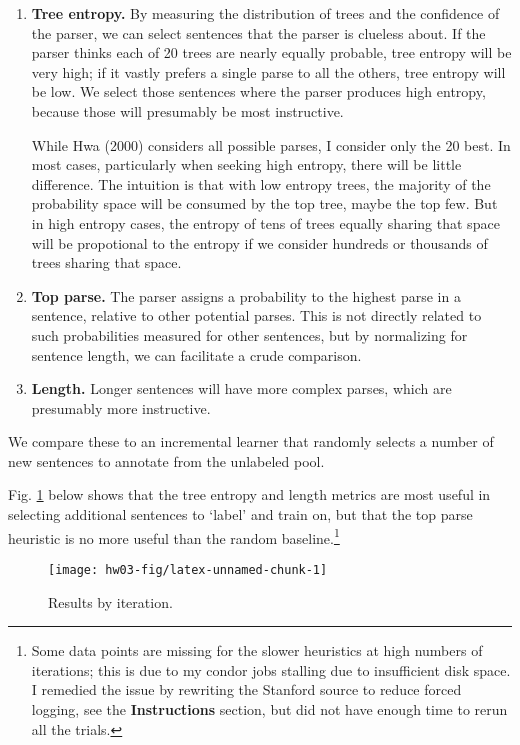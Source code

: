 \documentclass[10pt]{article}\usepackage{graphicx, color}
\newenvironment{knitrout}{}{} %
\begin{document}
\begin{enumerate}
  \item \textbf{Tree entropy.} By measuring the distribution of trees and the confidence of the parser, we can select sentences that the parser is clueless about. If the parser thinks each of 20 trees are nearly equally probable, tree entropy will be very high; if it vastly prefers a single parse to all the others, tree entropy will be low. We select those sentences where the parser produces high entropy, because those will presumably be most instructive.

  While Hwa (2000) considers all possible parses, I consider only the 20 best. In most cases, particularly when seeking high entropy, there will be little difference. The intuition is that with low entropy trees, the majority of the probability space will be consumed by the top tree, maybe the top few. But in high entropy cases, the entropy of tens of trees equally sharing that space will be propotional to the entropy if we consider hundreds or thousands of trees sharing that space.

  \item \textbf{Top parse.} The parser assigns a probability to the highest parse in a sentence, relative to other potential parses. This is not directly related to such probabilities measured for other sentences, but by normalizing for sentence length, we can facilitate a crude comparison.
  \item \textbf{Length.} Longer sentences will have more complex parses, which are presumably more instructive.
\end{enumerate}

We compare these to an incremental learner that randomly selects a number of new sentences to annotate from the unlabeled pool.

\pagebreak

Fig. \ref{figure:origparse2} below shows that the tree entropy and length metrics are most useful in selecting additional sentences to `label' and train on, but that the top parse heuristic is no more useful than the random baseline.\footnote{Some data points are missing for the slower heuristics at high numbers of iterations; this is due to my condor jobs stalling due to insufficient disk space. I remedied the issue by rewriting the Stanford source to reduce forced logging, see the \textbf{Instructions} section, but did not have enough time to rerun all the trials.}

\begin{figure}[H]
\begin{knitrout}\small
{}\color{fgcolor}

{\centering \texttt{[image: hw03-fig/latex-unnamed-chunk-1]} 

}



\end{knitrout}

  \caption{Results by iteration.}
  \label{figure:origparse2}
\end{figure}
\end{document}
